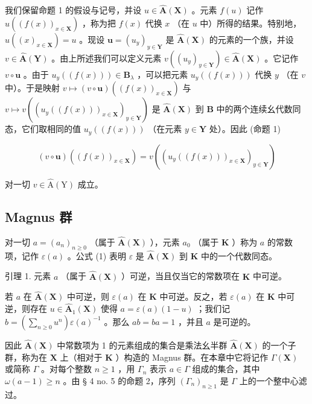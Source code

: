 我们保留命题 1 的假设与记号，并设 \(u \in \hat{\mathbf{A}}(\mathbf{X})\) 。元素 \(f(u)\) 记作 \(u((f(x))_{x \in \mathbf{X}})\) ，称为把 \(f(x)\) 代换 \(x\) （在 \(u\) 中）所得的结果。特别地， \(u((x)_{x \in \mathbf{X}}) = u\) 。现设 \(\boldsymbol{u} = (u_y)_{y \in \mathbf{Y}}\) 是 \(\hat{\mathbf{A}}(\mathbf{X})\) 的元素的一个族，并设 \(v \in \hat{\mathbf{A}}(\mathbf{Y})\) 。由上所述我们可以定义元素 \(v((u_y)_{y \in \mathbf{Y}}) \in \hat{\mathbf{A}}(\mathbf{X})\) 。它记作 \(v \circ \boldsymbol{u}\) 。由于 \(u_y((f(x))) \in \mathbf{B}_{\lambda}\) ，可以把元素 \(u_y((f(x)))\) 代换 \(y\) （在 \(v\) 中）。于是映射 \(v \mapsto (v \circ \boldsymbol{u})((f(x))_{x \in \mathbf{X}})\) 与 \(v \mapsto v((u_y((f(x)))_{x \in \mathbf{X}})_{y \in \mathbf{Y}})\) 是 \(\hat{\mathbf{A}}(\mathbf{X})\) 到 \(\mathbf{B}\) 中的两个连续幺代数同态，它们取相同的值 \(u_y((f(x)))\) （在元素 \(y \in \mathbf{Y}\) 处）。因此 (命题 1)

\[
(v \circ \boldsymbol {u}) ((f (x))_{x \in \mathbf{X}}) = v ((u _ {y} ((f (x)))_{x \in \mathbf{X}})_{y \in \mathbf{Y}})\tag{2}
\]

对一切 \(v \in \hat{\mathrm{A}}(\mathrm{Y})\) 成立。

\subsection{Magnus 群}

对一切 \(a = (a_n)_{n \geq 0}\) （属于 \(\hat{\mathbf{A}}(\mathbf{X})\) ），元素 \(a_0\) （属于 \(\mathbf{K}\) ）称为 \(a\) 的常数项，记作 \(\varepsilon(a)\) 。公式 (1) 表明 \(\varepsilon\) 是 \(\hat{\mathbf{A}}(\mathbf{X})\) 到 \(\mathbf{K}\) 中的一个代数同态。

引理 1. 元素 \(a\) （属于 \(\hat{\mathbf{A}}(\mathbf{X})\) ）可逆，当且仅当它的常数项在 \(\mathbf{K}\) 中可逆。

若 \(a\) 在 \(\hat{\mathbf{A}}(\mathbf{X})\) 中可逆，则 \(\varepsilon(a)\) 在 \(\mathbf{K}\) 中可逆。反之，若 \(\varepsilon(a)\) 在 \(\mathbf{K}\) 中可逆，则存在 \(u \in \hat{\mathbf{A}}_1(\mathbf{X})\) 使得 \(a = \varepsilon(a)(1 - u)\) ；我们记 \(b = \left(\sum_{n \geqslant 0} u^n\right)\varepsilon(a)^{-1}\) 。那么 \(ab = ba = 1\) ，并且 \(a\) 是可逆的。

因此 \(\hat{\mathbf{A}}(\mathbf{X})\) 中常数项为 1 的元素组成的集合是乘法幺半群 \(\hat{\mathbf{A}}(\mathbf{X})\) 的一个子群，称为在 \(\mathbf{X}\) 上（相对于 \(\mathbf{K}\) ）构造的 Magnus 群。在本章中它将记作 \(\Gamma(\mathbf{X})\) 或简称 \(\Gamma\) 。对每个整数 \(n \geqslant 1\) ，用 \(\Gamma_n\) 表示 \(a \in \Gamma\) 组成的集合，其中 \(\omega(a - 1) \geqslant n\) 。由 § 4 no. 5 的命题 2，序列 \((\Gamma_n)_{n \geqslant 1}\) 是 \(\Gamma\) 上的一个整中心滤过。

